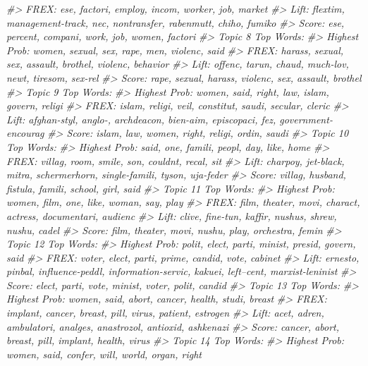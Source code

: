 \documentclass[]{book}
\newenvironment{Shaded}{\begin{snugshade}}{\end{snugshade}}
\newcommand{\CommentTok}[1]{\textcolor[rgb]{0.56,0.35,0.01}{\textit{#1}}}
\begin{document}
\begin{Shaded}
\begin{Highlighting}[]
\CommentTok{#>       FREX: ese, factori, employ, incom, worker, job, market }
\CommentTok{#>       Lift: flextim, management-track, nec, nontransfer, rabenmutt, chiho, fumiko }
\CommentTok{#>       Score: ese, percent, compani, work, job, women, factori }
\CommentTok{#> Topic 8 Top Words:}
\CommentTok{#>       Highest Prob: women, sexual, sex, rape, men, violenc, said }
\CommentTok{#>       FREX: harass, sexual, sex, assault, brothel, violenc, behavior }
\CommentTok{#>       Lift: offenc, tarun, chaud, much-lov, newt, tiresom, sex-rel }
\CommentTok{#>       Score: rape, sexual, harass, violenc, sex, assault, brothel }
\CommentTok{#> Topic 9 Top Words:}
\CommentTok{#>       Highest Prob: women, said, right, law, islam, govern, religi }
\CommentTok{#>       FREX: islam, religi, veil, constitut, saudi, secular, cleric }
\CommentTok{#>       Lift: afghan-styl, anglo-, archdeacon, bien-aim, episcopaci, fez, government-encourag }
\CommentTok{#>       Score: islam, law, women, right, religi, ordin, saudi }
\CommentTok{#> Topic 10 Top Words:}
\CommentTok{#>       Highest Prob: said, one, famili, peopl, day, like, home }
\CommentTok{#>       FREX: villag, room, smile, son, couldnt, recal, sit }
\CommentTok{#>       Lift: charpoy, jet-black, mitra, schermerhorn, single-famili, tyson, uja-feder }
\CommentTok{#>       Score: villag, husband, fistula, famili, school, girl, said }
\CommentTok{#> Topic 11 Top Words:}
\CommentTok{#>       Highest Prob: women, film, one, like, woman, say, play }
\CommentTok{#>       FREX: film, theater, movi, charact, actress, documentari, audienc }
\CommentTok{#>       Lift: clive, fine-tun, kaffir, nushus, shrew, nushu, cadel }
\CommentTok{#>       Score: film, theater, movi, nushu, play, orchestra, femin }
\CommentTok{#> Topic 12 Top Words:}
\CommentTok{#>       Highest Prob: polit, elect, parti, minist, presid, govern, said }
\CommentTok{#>       FREX: voter, elect, parti, prime, candid, vote, cabinet }
\CommentTok{#>       Lift: ernesto, pinbal, influence-peddl, information-servic, kakuei, left--cent, marxist-leninist }
\CommentTok{#>       Score: elect, parti, vote, minist, voter, polit, candid }
\CommentTok{#> Topic 13 Top Words:}
\CommentTok{#>       Highest Prob: women, said, abort, cancer, health, studi, breast }
\CommentTok{#>       FREX: implant, cancer, breast, pill, virus, patient, estrogen }
\CommentTok{#>       Lift: acet, adren, ambulatori, analges, anastrozol, antioxid, ashkenazi }
\CommentTok{#>       Score: cancer, abort, breast, pill, implant, health, virus }
\CommentTok{#> Topic 14 Top Words:}
\CommentTok{#>       Highest Prob: women, said, confer, will, world, organ, right }

\end{Highlighting}
\end{Shaded}
\end{document}
